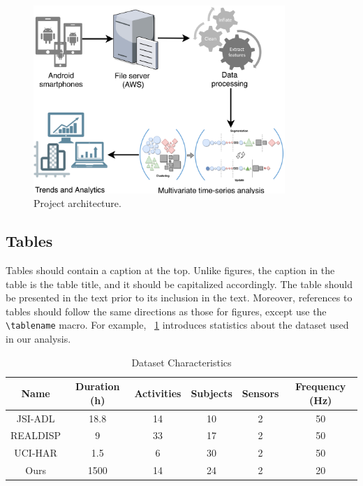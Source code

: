 \begin{figure}[tbh]
  \centering
  \includegraphics[width=0.85\textwidth]{figures/proj-arch.pdf}
  \caption{Project architecture.}
  \label{fig:proj-arch}
\end{figure}


\subsection{Tables}\label{sec:latex:tables}

Tables should contain a caption at the top. Unlike figures, the caption in the table is the table title, and it should be capitalized accordingly. The table should be presented in the text prior to its inclusion in the text. Moreover, references to tables should follow the same directions as those for figures, except use the \texttt{{\textbackslash}tablename} macro. For example, \tablename~\ref{tbl:dataset} introduces statistics about the dataset used in our analysis.

\begin{table}[tb]
\caption{Dataset Characteristics}
\label{tbl:dataset}
\centering
\begin{tabular}{c|c|c|c|c|c}
\hline
\textbf{Name} & \textbf{Duration (h)} & \textbf{Activities} & \textbf{Subjects}  & \textbf{Sensors} & \textbf{Frequency (Hz)} \\ 
\hline
JSI-ADL & 18.8 & 14 & 10 & 2 & 50\\ 
REALDISP & 9 & 33 & 17 & 2 & 50\\ 
UCI-HAR & 1.5 & 6 & 30 & 2 & 50\\ 
Ours & 1500 & 14 & 24 & 2 & 20\\ 
\hline
\end{tabular}
\end{table}


